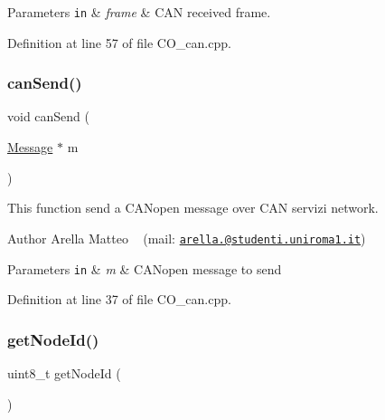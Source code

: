 \begin{DoxyParams}[1]{Parameters}
\mbox{\tt in}  & {\em frame} & C\+AN received frame. \\
\hline
\end{DoxyParams}


Definition at line 57 of file C\+O\+\_\+can.\+cpp.

\mbox{\label{group___c_a_n__network__module_ga44cc9b79c50c2c8eef6b98bac0d24dc9}} 
\subsubsection{\texorpdfstring{can\+Send()}{canSend()}}
{\footnotesize\ttfamily void can\+Send (\begin{DoxyParamCaption}\item[{\mbox{\hyperlink{struct_message}{Message}} $\ast$}]{m }\end{DoxyParamCaption})}



This function send a C\+A\+Nopen message over C\+AN servizi network. 

\begin{DoxyAuthor}{Author}
Arella Matteo ~\newline
 (mail\+: \href{mailto:arella.1646983@studenti.uniroma1.it}{\tt arella.@studenti.\+uniroma1.\+it})
\end{DoxyAuthor}

\begin{DoxyParams}[1]{Parameters}
\mbox{\tt in}  & {\em m} & C\+A\+Nopen message to send \\
\hline
\end{DoxyParams}


Definition at line 37 of file C\+O\+\_\+can.\+cpp.

\mbox{\label{group___c_a_n__network__module_gabf47bce7c4c8d2166fe3e25ac404d7c7}} 
\subsubsection{\texorpdfstring{get\+Node\+Id()}{getNodeId()}}
{\footnotesize\ttfamily uint8\+\_\+t get\+Node\+Id (\begin{DoxyParamCaption}{ }\end{DoxyParamCaption})}




